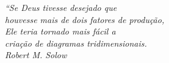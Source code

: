 \begin{epigrafe}
    \vspace*{\fill}
	\begin{flushright}
		\textit{``Se Deus tivesse desejado que\\
        houvesse mais de dois fatores de produção,\\
        Ele teria tornado mais fácil a\\
        criação de diagramas tridimensionais.\\
        Robert M. Solow
		}
	\end{flushright}
\end{epigrafe}
